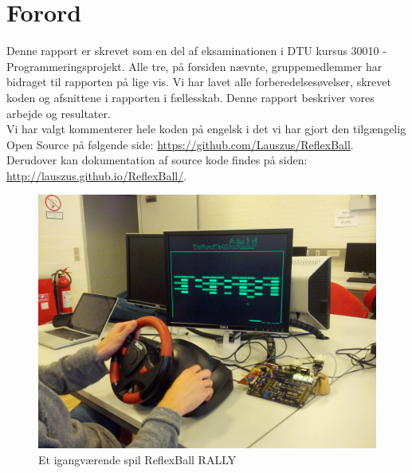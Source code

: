 \chapter{Forord}

Denne rapport er skrevet som en del af eksaminationen i DTU kursus 30010 - Programmeringsprojekt. Alle tre, på forsiden nævnte, gruppemedlemmer har bidraget til rapporten på lige vis. Vi har lavet alle forberedelsesøvelser, skrevet koden og afsnittene i rapporten i fællesskab. Denne rapport beskriver vores arbejde og resultater.
\\

Vi har valgt kommenterer hele koden på engelsk i det vi har gjort den tilgængelig Open Source på følgende side: \url{https://github.com/Lauszus/ReflexBall}.\\
Derudover kan dokumentation af source kode findes på siden: \url{http://lauszus.github.io/ReflexBall/}.
\\

\begin{figure}[h!]
\centering
\includegraphics[scale=0.17]{figs/forside.jpg}
\caption{Et igangværende spil ReflexBall RALLY}
\label{fig:forside}
\end{figure}